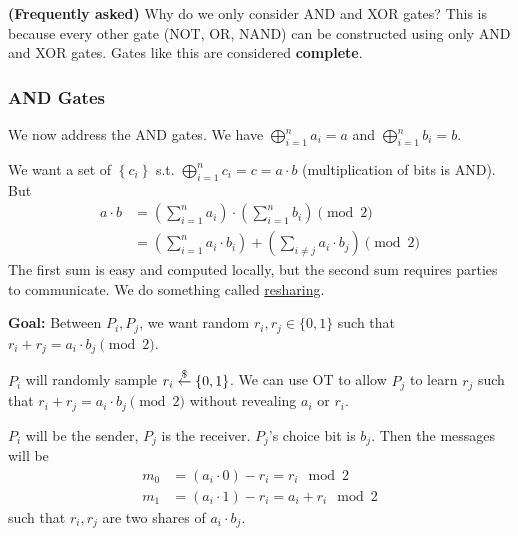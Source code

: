 \begin{remark}
    \textbf{(Frequently asked)} Why do we only consider AND and XOR gates? This is because every other gate (NOT, OR, NAND) can be constructed using only AND and XOR gates. Gates like this are considered \textbf{complete}.
\end{remark}

\subsubsection{AND Gates}
We now address the \textsf{AND} gates. We have $\bigoplus^n_{i=1}a_i = a$ and $\bigoplus^n_{i=1}b_i = b$.

We want a set of $\left\{ c_i \right\}$ s.t. $\bigoplus^n_{i=1}c_i = c = a \cdot b$ (multiplication of bits is \textsf{AND}). But
\begin{align*}
    a\cdot b
     & = \left( \sum^n_{i=1}a_i \right)\cdot \left( \sum^n_{i=1}b_i \right)\pmod{2}                \\
     & = \left( \sum^n_{i=1}a_i \cdot b_i \right) + \left( \sum_{i\neq j}a_i \cdot b_j \right)\pmod{2}
\end{align*}
The first sum is easy and computed locally, but the second sum requires parties to communicate. We do something called \ul{resharing}.

\textbf{Goal:} Between $P_i, P_j$, we want random $r_i, r_j\in\{0, 1\}$ such that $r_i + r_j = a_i \cdot b_j \pmod{2}$.

$P_i$ will randomly sample $r_i\overset{\$}{\leftarrow} \left\{ 0, 1 \right\}$. We can use OT to allow $P_j$ to learn $r_j$ such that $r_i + r_j = a_i\cdot b_j\pmod{2}$ without revealing $a_i$ or $r_i$.

$P_i$ will be the sender, $P_j$ is the receiver. $P_j$'s choice bit is $b_j$. Then the messages will be
\begin{align*}
    m_0 & = (a_i\cdot 0) - r_i = r_i \mod 2\\
    m_1 & = (a_i\cdot 1) - r_i = a_i + r_i \mod 2
\end{align*}
such that $r_i, r_j$ are two shares of $a_i\cdot b_j$.


